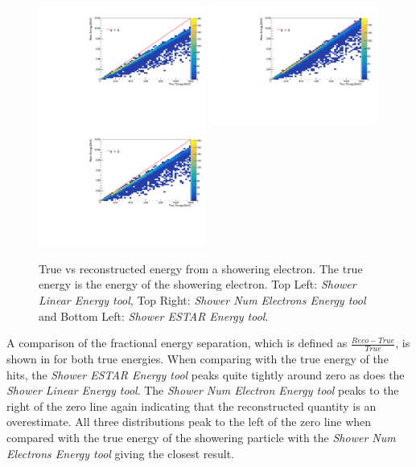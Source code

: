 \begin{figure}[h!]
    \centering
    \includegraphics[width = 0.49\textwidth]{figures-chap4/true_vs_reco_showeringE_linear.pdf}
    \includegraphics[width = 0.49\textwidth]{figures-chap4/true_vs_reco_showeringE_oldmethod.pdf}
    \includegraphics[width = 0.49\textwidth]{figures-chap4/true_vs_reco_showeringE_ESTAR.pdf}
    \captionsetup{width=0.45\textwidth}
    \parbox[b]{0.49\textwidth}%
  {
    \caption[True vs reconstructed energy from a showering electron. The true energy is the energy of the showering electron.]
    {True vs reconstructed energy from a showering electron. The true energy is the energy of the showering electron. Top Left: \textit{Shower Linear Energy tool}, Top Right: \textit{Shower Num Electrons Energy tool} and Bottom Left: \textit{Shower ESTAR Energy tool}. \\}
    \label{fig:reco_vs_true_showeringE}}
\end{figure}

\newpage
A comparison of the fractional energy separation, which is defined as $\frac{Reco - True}{True}$, is shown in  for both true energies. When comparing with the true energy of the hits, the \textit{Shower ESTAR Energy tool} peaks quite tightly around zero as does the \textit{Shower Linear Energy tool}. The \textit{Shower Num Electron Energy tool} peaks to the right of the zero line again indicating that the reconstructed quantity is an overestimate. All three distributions peak to the left of the zero line when compared with the true energy of the showering particle with the \textit{Shower Num Electrons Energy tool} giving the closest result. 



